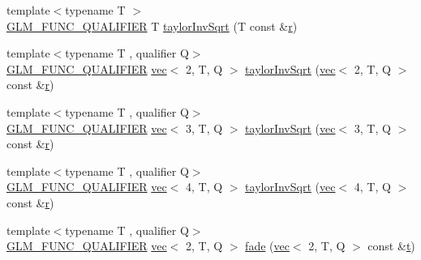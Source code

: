 \begin{DoxyCompactItemize}
\item 
{\footnotesize template$<$typename T $>$ }\\\mbox{\hyperlink{setup_8hpp_a33fdea6f91c5f834105f7415e2a64407}{G\+L\+M\+\_\+\+F\+U\+N\+C\+\_\+\+Q\+U\+A\+L\+I\+F\+I\+ER}} T \mbox{\hyperlink{namespaceglm_1_1detail_a82e6fa9d633a5f76f8b7e046ac5d91f4}{taylor\+Inv\+Sqrt}} (T const \&\mbox{\hyperlink{_s_d_l__opengl_8h_a42ce7cdc612e53abee15043f80220d97}{r}})
\item 
{\footnotesize template$<$typename T , qualifier Q$>$ }\\\mbox{\hyperlink{setup_8hpp_a33fdea6f91c5f834105f7415e2a64407}{G\+L\+M\+\_\+\+F\+U\+N\+C\+\_\+\+Q\+U\+A\+L\+I\+F\+I\+ER}} \mbox{\hyperlink{structglm_1_1vec}{vec}}$<$ 2, T, Q $>$ \mbox{\hyperlink{namespaceglm_1_1detail_aa7082f2eab56cda8156f3ab94e8653a2}{taylor\+Inv\+Sqrt}} (\mbox{\hyperlink{structglm_1_1vec}{vec}}$<$ 2, T, Q $>$ const \&\mbox{\hyperlink{_s_d_l__opengl_8h_a42ce7cdc612e53abee15043f80220d97}{r}})
\item 
{\footnotesize template$<$typename T , qualifier Q$>$ }\\\mbox{\hyperlink{setup_8hpp_a33fdea6f91c5f834105f7415e2a64407}{G\+L\+M\+\_\+\+F\+U\+N\+C\+\_\+\+Q\+U\+A\+L\+I\+F\+I\+ER}} \mbox{\hyperlink{structglm_1_1vec}{vec}}$<$ 3, T, Q $>$ \mbox{\hyperlink{namespaceglm_1_1detail_a5de2dc069a7f92df3b0bfdd27b70e1c3}{taylor\+Inv\+Sqrt}} (\mbox{\hyperlink{structglm_1_1vec}{vec}}$<$ 3, T, Q $>$ const \&\mbox{\hyperlink{_s_d_l__opengl_8h_a42ce7cdc612e53abee15043f80220d97}{r}})
\item 
{\footnotesize template$<$typename T , qualifier Q$>$ }\\\mbox{\hyperlink{setup_8hpp_a33fdea6f91c5f834105f7415e2a64407}{G\+L\+M\+\_\+\+F\+U\+N\+C\+\_\+\+Q\+U\+A\+L\+I\+F\+I\+ER}} \mbox{\hyperlink{structglm_1_1vec}{vec}}$<$ 4, T, Q $>$ \mbox{\hyperlink{namespaceglm_1_1detail_a9547b07e16ac5f72eda78b5bf000fe14}{taylor\+Inv\+Sqrt}} (\mbox{\hyperlink{structglm_1_1vec}{vec}}$<$ 4, T, Q $>$ const \&\mbox{\hyperlink{_s_d_l__opengl_8h_a42ce7cdc612e53abee15043f80220d97}{r}})
\item 
{\footnotesize template$<$typename T , qualifier Q$>$ }\\\mbox{\hyperlink{setup_8hpp_a33fdea6f91c5f834105f7415e2a64407}{G\+L\+M\+\_\+\+F\+U\+N\+C\+\_\+\+Q\+U\+A\+L\+I\+F\+I\+ER}} \mbox{\hyperlink{structglm_1_1vec}{vec}}$<$ 2, T, Q $>$ \mbox{\hyperlink{namespaceglm_1_1detail_a4c0b9a9b95c2a1fead2e29b2538510cd}{fade}} (\mbox{\hyperlink{structglm_1_1vec}{vec}}$<$ 2, T, Q $>$ const \&\mbox{\hyperlink{_s_d_l__opengl_8h_a7d65d00ca3b0630d9b5c52df855b19f5}{t}})

\end{DoxyCompactItemize}

